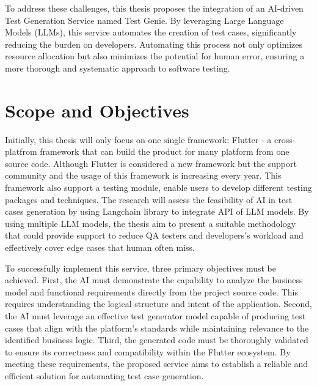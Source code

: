 \hspace{0.2cm} To address these challenges, this thesis proposes the integration of an AI-driven Test Generation Service named Test Genie. By leveraging Large Language Models (LLMs), this service automates the creation of test cases, significantly reducing the burden on developers. Automating this process not only optimizes resource allocation but also minimizes the potential for human error, ensuring a more thorough and systematic approach to software testing.


\section{Scope and Objectives}

\hspace{0.2cm}Initially, this thesis will only focus on one single framework: Flutter - a cross-platfrom framework that can build the product for many platform from one source code. Although Flutter is considered a new framework but the support community and the usage of this framework is increasing every year. This framework also support a testing module, enable users to develop different testing packages and techniques. The research will assess the feasibility of AI in test cases generation by using Langchain library to integrate API of LLM models. By using multiple LLM models, the thesis aim to present a suitable methodology that could provide support to reduce QA testers and developers's workload and effectively cover edge cases that human often miss.

\hspace{0.2cm}To successfully implement this service, three primary objectives must be achieved. First, the AI must demonstrate the capability to analyze the business model and functional requirements directly from the project source code. This requires understanding the logical structure and intent of the application. Second, the AI must leverage an effective test generator model capable of producing test cases that align with the platform's standards while maintaining relevance to the identified business logic. Third, the generated code must be thoroughly validated to ensure its correctness and compatibility within the Flutter ecosystem. By meeting these requirements, the proposed service aims to establish a reliable and efficient solution for automating test case generation.

